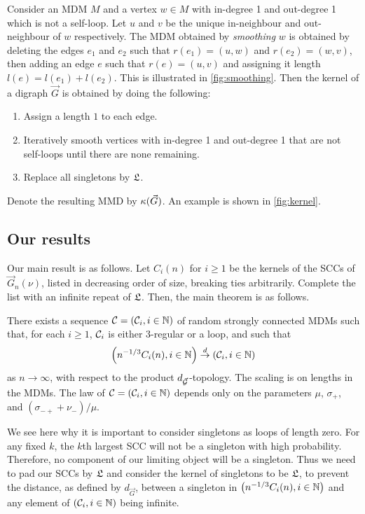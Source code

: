 Consider an MDM $M$ and a vertex $w \in M$ with in-degree 1 and out-degree 1 which is not a self-loop. Let $u$ and $v$ be the unique in-neighbour and out-neighbour of $w$ respectively. The MDM obtained by \emph{smoothing} $w$ is obtained by deleting the edges $e_1$ and $e_2$ such that $r(e_1) = (u, w)$ and $r(e_2) = (w, v)$, then adding an edge $e$ such that $r(e) = (u, v)$ and assigning it length $l(e) = l(e_1) + l(e_2)$. This is illustrated in \cref{fig:smoothing}. Then the kernel of a digraph $\vec{G}$ is obtained by doing the following:
\begin{enumerate}
    \item Assign a length $1$ to each edge.
    \item Iteratively smooth vertices with in-degree 1 and out-degree 1 that are not self-loops until there are none remaining.
    \item Replace all singletons by $\mathfrak L$.
\end{enumerate}
Denote the resulting MMD by $\kappa(\vec{G})$. An example is shown in \cref{fig:kernel}.

\subsection{Our results}

Our main result is as follows. Let $C_i(n)$ for $i\geq 1$ be the kernels of the SCCs of $\vec{G}_n(\nu)$, listed in decreasing order of size, breaking ties arbitrarily. Complete the list with an infinite repeat of $\mathfrak L$. Then, the main theorem is as follows.
\begin{theorem}\label{thm.main}
There exists a sequence ${\mathcal C}=({\mathcal C}_i,i\in {\mathbb N})$ of random strongly connected MDMs such that, for each $i\geq 1$, ${\mathcal C}_i$ is either $3$-regular or a loop, and such that 
$$\left(n^{-1/3}C_i(n),i\in {\mathbb N}\right)\overset{d}{\to}\left({\mathcal C}_i,i\in {\mathbb N}\right)$$
as $n\to \infty$, with respect to the product $d_{\vec{{\mathcal G}}}$-topology. The scaling is on lengths in the MDMs. The law of ${\mathcal C}=({\mathcal C}_i,i\in {\mathbb N})$ depends only on the parameters $\mu$, $\sigma_+$, and $(\sigma_{-+}+\nu_-)/\mu$.
\end{theorem}
We see here why it is important to consider singletons as loops of length zero. For any fixed $k$, the $k$th largest SCC will not be a singleton with high probability. Therefore, no component of our limiting object will be a singleton. Thus we need to pad our SCCs by $\mathfrak L$ and consider the kernel of singletons to be $\mathfrak L$, to prevent the distance, as defined by $d_{\vec{G}}$, between a singleton in $\left(n^{-1/3}C_i(n),i\in {\mathbb N}\right)$ and any element of $\left({\mathcal C}_i,i\in {\mathbb N}\right)$ being infinite.

